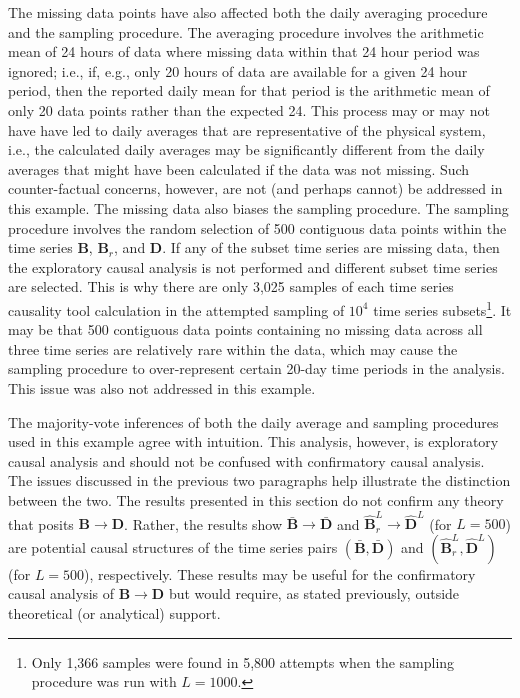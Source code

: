 \documentclass{article}[10pt]
\begin{document}
The missing data points have also affected both the daily averaging procedure and the sampling procedure.  The averaging procedure involves the arithmetic mean of 24 hours of data where missing data within that 24 hour period was ignored; i.e., if, e.g., only 20 hours of data are available for a given 24 hour period, then the reported daily mean for that period is the arithmetic mean of only 20 data points rather than the expected 24.  This process may or may not have have led to daily averages that are representative of the physical system, i.e., the calculated daily averages may be significantly different from the daily averages that might have been calculated if the data was not missing.  Such counter-factual concerns, however, are not (and perhaps cannot) be addressed in this example.  The missing data also biases the sampling procedure.  The sampling procedure involves the random selection of 500 contiguous data points within the time series $\mathbf{B}$, $\mathbf{B}_r$, and $\mathbf{D}$.  If any of the subset time series are missing data, then the exploratory causal analysis is not performed and different subset time series are selected.  This is why there are only 3,025 samples of each time series causality tool calculation in the attempted sampling of $10^4$ time series subsets\footnote{Only 1,366 samples were found in 5,800 attempts when the sampling procedure was run with $L=1000$.}.  It may be that 500 contiguous data points containing no missing data across all three time series are relatively rare within the data, which may cause the sampling procedure to over-represent certain 20-day time periods in the analysis.  This issue was also not addressed in this example.  

The majority-vote inferences of both the daily average and sampling procedures used in this example agree with intuition.  This analysis, however, is exploratory causal analysis and should not be confused with confirmatory causal analysis.  The issues discussed in the previous two paragraphs help illustrate the distinction between the two.  The results presented in this section do not confirm any theory that posits $\mathbf{B}\rightarrow\mathbf{D}$.  Rather, the results show $\bar{\mathbf{B}}\rightarrow\bar{\mathbf{D}}$ and $\hat{\mathbf{B}}^L_r\rightarrow\hat{\mathbf{D}}^L$ (for $L=500$) are potential causal structures of the time series pairs $(\bar{\mathbf{B}},\bar{\mathbf{D}})$ and $(\hat{\mathbf{B}}^L_r,\hat{\mathbf{D}}^L)$ (for $L=500$), respectively.  These results may be useful for the confirmatory causal analysis of $\mathbf{B}\rightarrow\mathbf{D}$ but would require, as stated previously, outside theoretical (or analytical) support.
\end{document}
